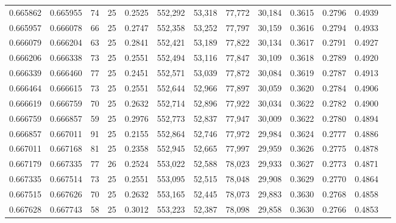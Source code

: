 \begin{tabular}{rrrrrrrrrrrrr}
0.665862 & 0.665955 &    74 &  25 &                                     0.2525 & 552,292 &  53,318 &  77,772 &  30,184 & 0.3615 & 0.2796 & 0.4939 \\
0.665957 & 0.666078 &    66 &  25 &                                     0.2747 & 552,358 &  53,252 &  77,797 &  30,159 & 0.3616 & 0.2794 & 0.4933 \\
0.666079 & 0.666204 &    63 &  25 &                                     0.2841 & 552,421 &  53,189 &  77,822 &  30,134 & 0.3617 & 0.2791 & 0.4927 \\
0.666206 & 0.666338 &    73 &  25 &                                     0.2551 & 552,494 &  53,116 &  77,847 &  30,109 & 0.3618 & 0.2789 & 0.4920 \\
0.666339 & 0.666460 &    77 &  25 &                                     0.2451 & 552,571 &  53,039 &  77,872 &  30,084 & 0.3619 & 0.2787 & 0.4913 \\
0.666464 & 0.666615 &    73 &  25 &                                     0.2551 & 552,644 &  52,966 &  77,897 &  30,059 & 0.3620 & 0.2784 & 0.4906 \\
0.666619 & 0.666759 &    70 &  25 &                                     0.2632 & 552,714 &  52,896 &  77,922 &  30,034 & 0.3622 & 0.2782 & 0.4900 \\
0.666759 & 0.666857 &    59 &  25 &                                     0.2976 & 552,773 &  52,837 &  77,947 &  30,009 & 0.3622 & 0.2780 & 0.4894 \\
0.666857 & 0.667011 &    91 &  25 &                                     0.2155 & 552,864 &  52,746 &  77,972 &  29,984 & 0.3624 & 0.2777 & 0.4886 \\
0.667011 & 0.667168 &    81 &  25 &                                     0.2358 & 552,945 &  52,665 &  77,997 &  29,959 & 0.3626 & 0.2775 & 0.4878 \\
0.667179 & 0.667335 &    77 &  26 &                                     0.2524 & 553,022 &  52,588 &  78,023 &  29,933 & 0.3627 & 0.2773 & 0.4871 \\
0.667335 & 0.667514 &    73 &  25 &                                     0.2551 & 553,095 &  52,515 &  78,048 &  29,908 & 0.3629 & 0.2770 & 0.4864 \\
0.667515 & 0.667626 &    70 &  25 &                                     0.2632 & 553,165 &  52,445 &  78,073 &  29,883 & 0.3630 & 0.2768 & 0.4858 \\
0.667628 & 0.667743 &    58 &  25 &                                     0.3012 & 553,223 &  52,387 &  78,098 &  29,858 & 0.3630 & 0.2766 & 0.4853 \\

\end{tabular}
